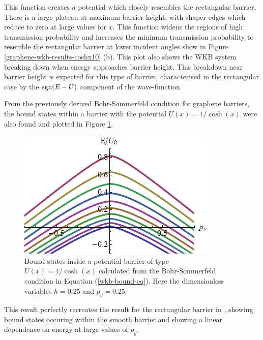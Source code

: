 		This function creates a potential which closely resembles the rectangular barrier. There is a large plateau at maximum barrier height, with shaper edges which reduce to zero at large values for $x$. This function widens the regions of high transmission probability and increases the minimum transmission probability to resemble the rectangular barrier at lower incident angles show in Figure \ref{graphene-wkb-results-coshx10} (b). This plot also shows the WKB system breaking down when energy approaches barrier height. This breakdown near barrier height is expected for this type of barrier, characterised in the rectangular case by the $\operatorname{sgn}(E-U)$ component of the wave-function.

		From the previously derived Bohr-Sommerfeld condition for graphene barriers, the bound states within a barrier with the potential $U(x)=1/\cosh(x)$  were also found and plotted in Figure \ref{wkb-energy-levels}. 
		\begin{figure}[h]
			\centerline{\includegraphics[scale=0.6]{images/wkb-energy-levels}}
			\caption{Bound states inside a potential barrier of type $U(x)=1/\cosh(x)$ calculated from the Bohr-Sommerfeld condition in Equation (\ref{wkb-bound-eq}). Here the dimensionless variables $h=0.25$ and $p_{y}=0.25$.}
			\label{wkb-energy-levels}
		\end{figure}

		This result perfectly recreates the result for the rectangular barrier in \cite{b3}, showing bound states occuring within the smooth barrier and showing a linear dependence on energy at large values of $p_{y}$.

